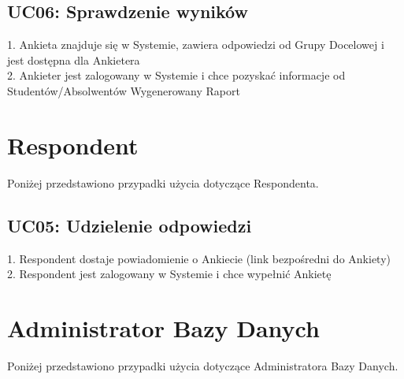 \subsection{UC06: Sprawdzenie wyników}
\label{Chapter325}

{
1. Ankieta znajduje się w Systemie, zawiera odpowiedzi od Grupy Docelowej i jest dostępna dla Ankietera \\
2. Ankieter jest zalogowany w Systemie i chce pozyskać informacje od Studentów/Absolwentów
}
{Wygenerowany Raport}{}
{}

\section{Respondent}
\label{Chapter33}

Poniżej przedstawiono przypadki użycia dotyczące Respondenta.

\subsection{UC05: Udzielenie odpowiedzi}
\label{Chapter331}

{
1. Respondent dostaje powiadomienie o Ankiecie (link bezpośredni do Ankiety) \\
2. Respondent jest zalogowany w Systemie i chce wypełnić Ankietę
}
{}{}
{}
{}

\section{Administrator Bazy Danych}
\label{Chapter34}

Poniżej przedstawiono przypadki użycia dotyczące Administratora Bazy Danych.

